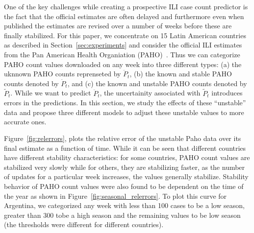 
One of the key challenges while creating a prospective ILI case count
predictor is the fact that the official estimates are often 
delayed and furthermore even when published the estimates are revised
over a number of weeks before these are finally stabilized.
For this paper, we concentrate on 15 Latin American countries 
as described in Section~\ref{sec:experiments} and consider the official 
ILI estimates from the Pan American Health Organiation (PAHO)~\cite{PAHO:2013}.
Thus we can categorize PAHO count values downloaded on any week
into three different types: (a) the uknnown
PAHO counts reprenseted  by $\ddot{P}_t$, (b) the known and stable PAHO counts
denoted by $\dot{P}_t$, and (c) the known and unstable PAHO counts denoted by
$\tilde{P}_t$. While we want to predict $\ddot{P}_t$, the uncertainity associated
with $\tilde{P}_t$ introduces errors in the predictions. In this section, 
we study the effects of these ``unstable'' data and propose 
three different models to adjust these unstable
values to more accurate ones.


Figure~\ref{fig:relerrors}, plots the relative error of the unstable Paho data over
its final estimate as a function of time. While it can be seen that different countries 
have different stability characteristics: 
for some countries, PAHO count values are
stabilized very slowly while for others, they are stabilizing faster, as the number of 
updates for a particular week increases, the values generally stabilize.
Stability behavior of PAHO count values were also found to be dependent on the 
time of the year as shown in Figure~\ref{fig:seasonal_relerrors}.
To plot this curve for Argentina, we categorized any week with less than 100 cases to be a low season,
greater than 300 tobe a high season and the remaining values to be low season (the thresholds
were different for different countries).

